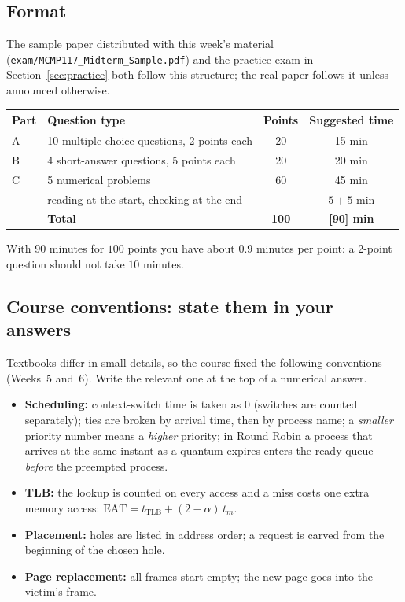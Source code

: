 \documentclass[11pt,a4paper]{article}
\begin{document}
\subsection{Format}
The sample paper distributed with this week's material (\texttt{exam/MCMP117\_Midterm\_Sample.pdf}) and the practice exam in Section~\ref{sec:practice} both follow this structure; the real paper follows it unless announced otherwise.
\begin{center}
\renewcommand{\arraystretch}{1.25}
\begin{tabular}{@{}llcc@{}}
\toprule
\textbf{Part} & \textbf{Question type} & \textbf{Points} & \textbf{Suggested time} \\
\midrule
A & 10 multiple-choice questions, 2 points each & 20 & 15 min \\
B & 4 short-answer questions, 5 points each & 20 & 20 min \\
C & 5 numerical problems & 60 & 45 min \\
 & reading at the start, checking at the end & & $5 + 5$ min \\
\midrule
 & \textbf{Total} & \textbf{100} & \textbf{[90] min} \\
\bottomrule
\end{tabular}
\end{center}
With $90$ minutes for $100$ points you have about $0.9$ minutes per point: a 2-point question should not take $10$ minutes.

\subsection{Course conventions: state them in your answers}
Textbooks differ in small details, so the course fixed the following conventions (Weeks~5 and~6). Write the relevant one at the top of a numerical answer.
\begin{keyidea}
\begin{itemize}[leftmargin=1.2em]
  \item \textbf{Scheduling:} context-switch time is taken as $0$ (switches are counted separately); ties are broken by arrival time, then by process name; a \emph{smaller} priority number means a \emph{higher} priority; in Round Robin a process that arrives at the same instant as a quantum expires enters the ready queue \emph{before} the preempted process.
  \item \textbf{TLB:} the lookup is counted on every access and a miss costs one extra memory access: $\text{EAT} = t_{\text{TLB}} + (2-\alpha)\,t_m$.
  \item \textbf{Placement:} holes are listed in address order; a request is carved from the beginning of the chosen hole.
  \item \textbf{Page replacement:} all frames start empty; the new page goes into the victim's frame.
\end{itemize}
\end{keyidea}
\end{document}
